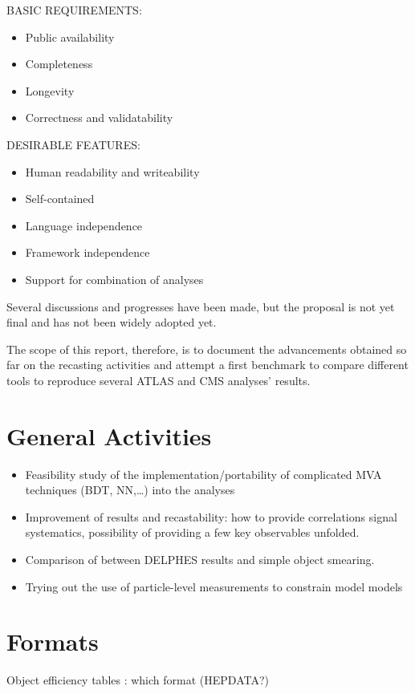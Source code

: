 \documentclass[11pt]{cernrep}
\begin{document}
BASIC REQUIREMENTS:
\begin{itemize}
  \item Public availability
  \item Completeness
  \item Longevity
  \item Correctness and validatability
\end{itemize}
DESIRABLE FEATURES:
\begin{itemize}
  \item Human readability and writeability
  \item Self-contained
  \item Language independence
  \item Framework independence
  \item Support for combination of analyses
\end{itemize}

Several discussions and progresses have been made, but the proposal is not yet final and has not been widely adopted yet.

The scope of this report, therefore, is to document the advancements obtained so far
on the recasting activities and attempt a first benchmark to compare different tools
to reproduce several ATLAS and CMS analyses' results.

\section{General Activities}

\begin{itemize}
  \item Feasibility study of the implementation/portability of complicated MVA techniques (BDT, NN,…) into the analyses
  \item Improvement of results and recastability: how to provide correlations signal systematics, possibility of providing a few key observables unfolded.
  \item Comparison of between DELPHES results and simple object smearing.
  \item Trying out the use of particle-level measurements to constrain model models
\end{itemize}

\section{Formats}
Object efficiency tables : which format (HEPDATA?)
\end{document}
